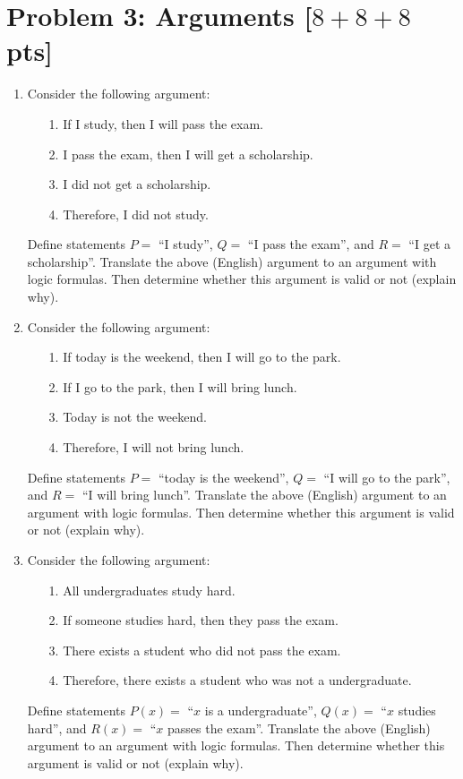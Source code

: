 \documentclass[11pt,twoside]{article}
\newcommand{\problem}[1]{\section*{Problem #1}}
\begin{document}
\problem{3: Arguments [$8+8+8$ pts]}
\begin{enumerate}
    \item Consider the following argument:
    \begin{enumerate}
        \item[1.] If I study, then I will pass the exam.
        \item[2.] I pass the exam, then I will get a scholarship.
        \item[3.] I did not get a scholarship.
        \item[4.] Therefore, I did not study.
    \end{enumerate}
    Define statements $P = $ ``I study'', $Q = $ ``I pass the exam'', and $R = $ ``I get a scholarship''.
    Translate the above (English) argument to an argument with logic formulas.
    Then determine whether this argument is valid or not (explain why).


    
    \item Consider the following argument:
    \begin{enumerate}
        \item[1.] If today is the weekend, then I will go to the park.
        \item[2.] If I go to the park, then I will bring lunch.
        \item[3.] Today is not the weekend.
        \item[4.] Therefore, I will not bring lunch.
    \end{enumerate}
    Define statements $P = $ ``today is the weekend'', $Q = $ ``I will go to the park'', and $R = $ ``I will bring lunch''.
    Translate the above (English) argument to an argument with logic formulas.
    Then determine whether this argument is valid or not (explain why).



    
    \item Consider the following argument:
    \begin{enumerate}
        \item[1.] All undergraduates study hard.
        \item[2.] If someone studies hard, then they pass the exam.
        \item[3.] There exists a student who did not pass the exam.
        \item[4.] Therefore, there exists a student who was not a undergraduate.
    \end{enumerate}
    Define statements $P(x) = $ ``$x$ is a undergraduate'', $Q(x) = $ ``$x$ studies hard'', and $R(x) = $ ``$x$ passes the exam''.
    Translate the above (English) argument to an argument with logic formulas.
    Then determine whether this argument is valid or not (explain why).    
\end{enumerate}
\end{document}
